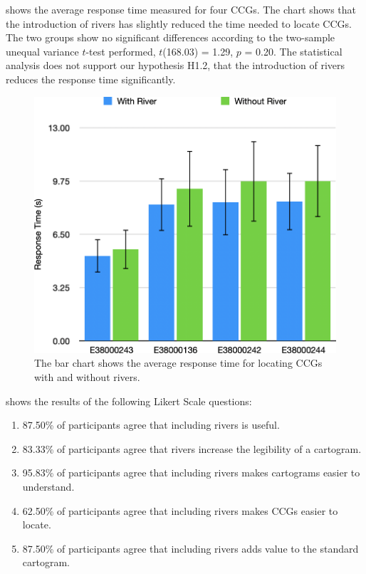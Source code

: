   shows the average response time measured for four CCGs. The chart shows that the introduction of rivers has slightly reduced the time needed to locate CCGs. The two groups show no significant differences according to the two-sample unequal variance $t$-test performed, $t$(168.03) = 1.29, $p$ = 0.20. The statistical analysis does not support our hypothesis H1.2, that the introduction of rivers reduces the response time significantly.

    {
        \begin{figure}[tb!]
            \centering
            \includegraphics[width=\columnwidth,keepaspectratio]{figure/evaluation/rt.png}
            \caption{The bar chart shows the average response time for locating CCGs with and without rivers.}
            \label{fig:task-rt}
        \end{figure}
    }

  shows the results of the following Likert Scale questions:
\begin{enumerate}[label=(\Alph*),align=left,leftmargin=*,labelindent=1em]
    \item 87.50\% of participants agree that including rivers is useful.
    \item 83.33\% of participants agree that rivers increase the legibility of a cartogram.
    \item 95.83\% of participants agree that including rivers makes cartograms easier to understand.
    \item 62.50\% of participants agree that including rivers makes CCGs easier to locate.
    \item 87.50\% of participants agree that including rivers adds value to the standard cartogram.
\end{enumerate}

